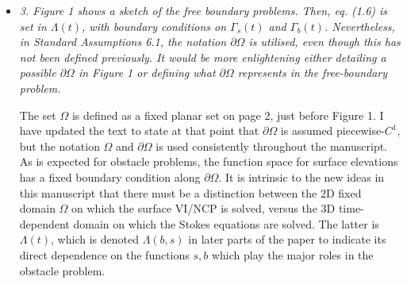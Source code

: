 \documentclass[11pt,reqno]{amsart}
\newcommand{\reply}[2]{%
\medskip
\item \emph{#1}

\medskip
\noindent #2
}
\begin{document}
\begin{itemize}[itemindent=0mm, labelsep=5mm]
\reply{3. Figure 1 shows a sketch of the free boundary problems. Then, eq. (1.6) is set in $\Lambda(t)$, with boundary conditions on $\Gamma_s(t)$ and $\Gamma_b(t)$.  Nevertheless, in Standard Assumptions 6.1, the notation $\partial\Omega$ is utilised, even though this has not been defined previously. It would be more enlightening either detailing a possible $\partial\Omega$ in Figure 1 or defining what $\partial\Omega$ represents in the free-boundary problem.}
{The set $\Omega$ is defined as a fixed planar set on page 2, just before Figure 1.  I have updated the text to state at that point that $\partial\Omega$ is assumed piecewise-$C^1$, but the notation $\Omega$ and $\partial\Omega$ is used consistently throughout the manuscript.  As is expected for obstacle problems, the function space for surface elevations has a fixed boundary condition along $\partial\Omega$.  It is intrinsic to the new ideas in this manuscript that there must be a distinction between the 2D fixed domain $\Omega$ on which the surface VI/NCP is solved, versus the 3D time-dependent domain on which the Stokes equations are solved.  The latter is $\Lambda(t)$, which is denoted $\Lambda(b,s)$ in later parts of the paper to indicate its direct dependence on the functions $s,b$ which play the major roles in the obstacle problem.}


\end{itemize}
\end{document}
